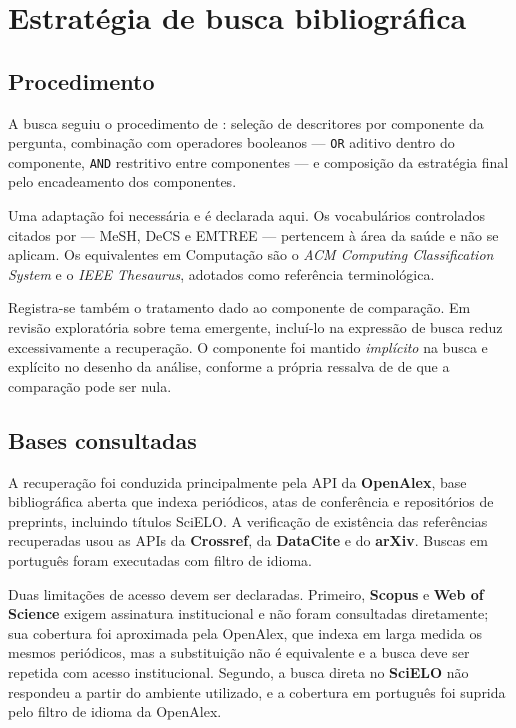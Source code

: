 \documentclass[12pt,a4paper]{article}
\begin{document}
\section{Estratégia de busca bibliográfica}

\subsection{Procedimento}

A busca seguiu o procedimento de \textcite{santos2007}: seleção de descritores por
componente da pergunta, combinação com operadores booleanos --- \texttt{OR} aditivo
dentro do componente, \texttt{AND} restritivo entre componentes --- e composição da
estratégia final pelo encadeamento dos componentes.

Uma adaptação foi necessária e é declarada aqui. Os vocabulários controlados citados
por \citeauthor{santos2007} --- MeSH, DeCS e EMTREE --- pertencem à área da saúde e não
se aplicam. Os equivalentes em Computação são o \emph{ACM Computing Classification
System} e o \emph{IEEE Thesaurus}, adotados como referência terminológica.

Registra-se também o tratamento dado ao componente de comparação. Em revisão
exploratória sobre tema emergente, incluí-lo na expressão de busca reduz
excessivamente a recuperação. O componente foi mantido \emph{implícito} na busca e
explícito no desenho da análise, conforme a própria ressalva de
\citeauthor{santos2007} de que a comparação pode ser nula.

\subsection{Bases consultadas}

A recuperação foi conduzida principalmente pela API da \textbf{OpenAlex}, base
bibliográfica aberta que indexa periódicos, atas de conferência e repositórios de
preprints, incluindo títulos SciELO. A verificação de existência das referências
recuperadas usou as APIs da \textbf{Crossref}, da \textbf{DataCite} e do
\textbf{arXiv}. Buscas em português foram executadas com filtro de idioma.

Duas limitações de acesso devem ser declaradas. Primeiro, \textbf{Scopus} e
\textbf{Web of Science} exigem assinatura institucional e não foram consultadas
diretamente; sua cobertura foi aproximada pela OpenAlex, que indexa em larga medida os
mesmos periódicos, mas a substituição não é equivalente e a busca deve ser repetida
com acesso institucional. Segundo, a busca direta no \textbf{SciELO} não respondeu a
partir do ambiente utilizado, e a cobertura em português foi suprida pelo filtro de
idioma da OpenAlex.
\end{document}
